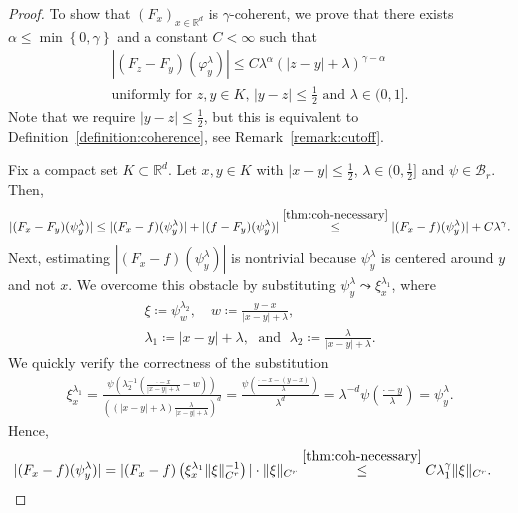 \begin{proof}
   To show that \({(F_x)}_{x \in \mathbb{R}^d}\) is \(\gamma\)-coherent, we prove that there exists \(\alpha \leq \min\left\{ 0, \gamma \right\}\) and a constant \(C < \infty\) such that
   \begin{gather*}
        |(F_z - F_y)(\varphi^\lambda_y)| \leq C\lambda^\alpha{(|z-y| + \lambda)}^{\gamma - \alpha}  \\ \text{uniformly for \(z,y \in K\), \(|y-z| \leq \frac{1}{2}\)  and \(\lambda \in (0,1]\)} \nonumber. %
   \end{gather*}  
   Note that we require \(|y-z| \leq \frac{1}{2}\), but this is equivalent to Definition~\ref{definition:coherence}, see Remark~\ref{remark:cutoff}.

   Fix a compact set \(K \subset \mathbb{R}^d\). Let \(x,y \in K\) with \(|x-y| \leq \frac{1}{2}\), \(\lambda \in (0, \frac{1}{2}]\) and \(\psi \in \mathcal{B}_r\). Then,
   \begin{align*}
    |(F_x - F_y)(\psi^\lambda_y)| \leq |(F_x - f)(\psi^\lambda_y)| + |(f - F_y)(\psi^\lambda_y)| \overset{\eqref{thm:coh-necessary}}{\leq} |(F_x - f)(\psi^\lambda_y)| + C \lambda^\gamma.
   \end{align*}
   Next, estimating \(|(F_x - f)(\psi^\lambda_y)|\) is nontrivial because \(\psi_y^\lambda\) is centered around \(y\) and not \(x\). We overcome this obstacle by substituting \(\psi^\lambda_y \leadsto \xi^{\lambda_1}_x\), where 
   \begin{gather*}
       \xi \coloneqq \psi^{\lambda_2}_w, \quad w \coloneqq \frac{y-x}{|x-y| + \lambda}, \\
    \lambda_1 \coloneqq |x-y| + \lambda, \;\text{ and } \; \lambda_2 \coloneqq \frac{\lambda}{|x-y|  + \lambda}.
   \end{gather*}
   We quickly verify the correctness of the substitution
   \begin{align*}
    \xi^{\lambda_1}_x = \frac{\psi\left(
        \lambda_2^{-1}\left(\frac{\cdot - x}{|x-y| + \lambda} - w\right)
    \right) }{\left((|x-y| + \lambda)\frac{\lambda}{|x-y| + \lambda}\right)^d}
    =
    \frac{\psi\left(
        \frac{\cdot - x - (y-x)}{\lambda}
    \right) }{\lambda^d} = \lambda^{-d}\psi\left( \frac{\cdot - y}{\lambda} \right) = \psi^\lambda_{y}.
   \end{align*}
   Hence, 
   \begin{align}
    |(F_x - f)(\psi^\lambda_y)| = |(F_x - f)\left( \xi^{\lambda_1}_x \lVert \xi \rVert_{C^{r}}^{-1} \right)| \cdot  \lVert \xi \rVert_{C^{r}} &\overset{\eqref{thm:coh-necessary}}{\leq} C\lambda_1^\gamma\lVert \xi \rVert_{C^{r}}. \label{SponsoredByGilette}

\end{align}
\end{proof}
